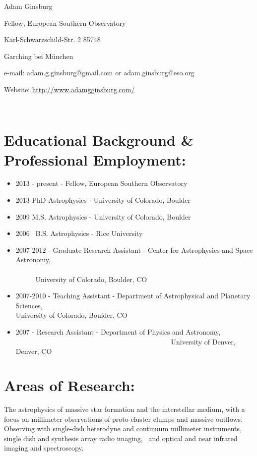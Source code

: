 \documentclass{article}
\begin{document}
\begin{centering}
\par Adam Ginsburg 
\par Fellow, European Southern Observatory
\par Karl-Schwarzschild-Str. 2 85748
\par Garching bei München
\par e-mail: adam.g.ginsburg@gmail.com or adam.ginsburg@eso.org
\par \hspace{20mm} Website: \url{http://www.adamgginsburg.com/}
\end{centering}
  
\section*{Educational Background \& Professional Employment: }
\begin{itemize}
    \item 2013 - present - Fellow, European Southern Observatory
    \item 2013 PhD Astrophysics - University of Colorado, Boulder 
    \item 2009 M.S. Astrophysics - University of Colorado, Boulder 
    \item 2006  B.S. Astrophysics - Rice University 
    \item 2007-2012 - Graduate Research Assistant - Center for Astrophysics and Space Astronomy, 
                                                                          University of Colorado, Boulder, CO 
    \item 2007-2010    - Teaching Assistant - Department of Astrophysical and Planetary Sciences, 
                                                              University of Colorado, Boulder, CO 
    \item 2007 - Research Assistant - Department of Physics and Astronomy, 
                                                 University of Denver, Denver, CO 
\end{itemize}

\section*{Areas of Research: }
The astrophysics of massive star formation and the interstellar medium, with a
focus on millimeter observations of proto-cluster clumps and massive outflows. 
Observing with single-dish heterodyne and continuum millimeter instruments,
single dish and synthesis array radio imaging,  and optical and near infrared
imaging and spectroscopy.  
\end{document}
